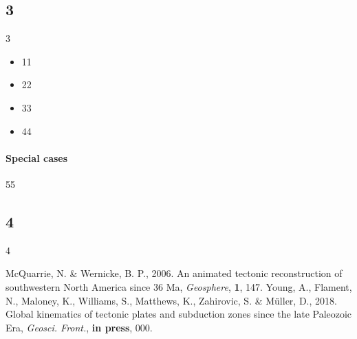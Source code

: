 \subsection{3}
3

\begin{itemize}
\item 11
\item 22
\item 33
\item 44
\end{itemize}

\paragraph{Special cases} 55

\subsection{4}
4

\begin{thebibliography}{}
  McQuarrie, N. \& Wernicke, B. P., 2006. An animated tectonic reconstruction of
  southwestern North America since 36 Ma, \textit{Geosphere}, \textbf{1},
  147.
  Young, A., Flament, N., Maloney, K., Williams, S., Matthews, K., Zahirovic,
  S.
  \& Müller, D., 2018. Global kinematics of tectonic plates and subduction zones
  since the late Paleozoic Era, \textit{Geosci. Front.},
  \textbf{in press}, 000.
\end{thebibliography}\label{lastpage}
